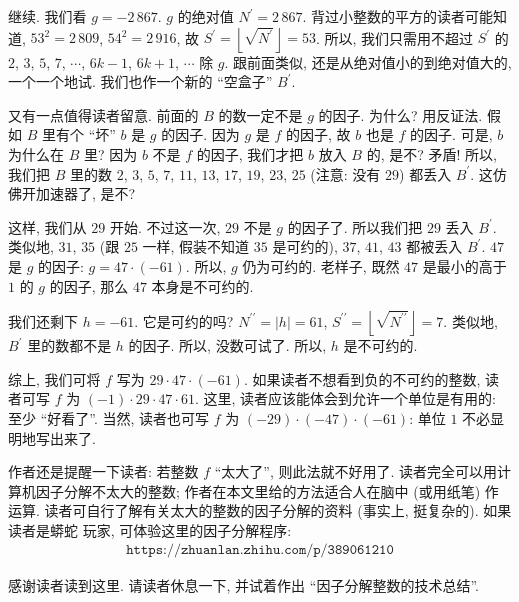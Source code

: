 \begin{example}
    继续. 我们看 $g = -2\,867$. $g$ 的绝对值 $N^{\prime} = 2\,867$. 背过小整数的平方的读者可能知道, $53^2 = 2\,809$, $54^2 = 2\,916$, 故 $S^{\prime} = \left \lfloor \sqrt{N^{\prime}} \right \rfloor = 53$. 所以, 我们只需用不超过 $S^{\prime}$ 的 $2$, $3$, $5$, $7$, $\cdots$, $6k-1$, $6k+1$, $\cdots$ 除 $g$. 跟前面类似, 还是从绝对值小的到绝对值大的, 一个一个地试. 我们也作一个新的 ``空盒子'' $B^{\prime}$.

    又有一点值得读者留意. 前面的 $B$ 的数一定不是 $g$ 的因子. 为什么? 用反证法. 假如 $B$ 里有个 ``坏'' $b$ 是 $g$ 的因子. 因为 $g$ 是 $f$ 的因子, 故 $b$ 也是 $f$ 的因子. 可是, $b$ 为什么在 $B$ 里? 因为 $b$ 不是 $f$ 的因子, 我们才把 $b$ 放入 $B$ 的, 是不? 矛盾! 所以, 我们把 $B$ 里的数 $2$, $3$, $5$, $7$, $11$, $13$, $17$, $19$, $23$, $25$ (注意: 没有 $29$) 都丢入 $B^{\prime}$. 这仿佛开加速器了, 是不?

    这样, 我们从 $29$ 开始. 不过这一次, $29$ 不是 $g$ 的因子了. 所以我们把 $29$ 丢入 $B^{\prime}$. 类似地, $31$, $35$ (跟 $25$ 一样, 假装不知道 $35$ 是可约的), $37$, $41$, $43$ 都被丢入 $B^{\prime}$. $47$ 是 $g$ 的因子: $g = 47 \cdot (-61)$. 所以, $g$ 仍为可约的. 老样子, 既然 $47$ 是最小的高于 $1$ 的 $g$ 的因子, 那么 $47$ 本身是不可约的.

    我们还剩下 $h = -61$. 它是可约的吗? $N^{\prime \prime} = |h| = 61$, $S^{\prime \prime} = \left \lfloor \sqrt{N^{\prime \prime}} \right \rfloor = 7$. 类似地, $B^{\prime}$ 里的数都不是 $h$ 的因子. 所以, 没数可试了. 所以, $h$ 是不可约的.

    综上, 我们可将 $f$ 写为 $29 \cdot 47 \cdot (-61)$. 如果读者不想看到负的不可约的整数, 读者可写 $f$ 为 $(-1) \cdot 29 \cdot 47 \cdot 61$. 这里, 读者应该能体会到允许一个单位是有用的: 至少 ``好看了''. 当然, 读者也可写 $f$ 为 $(-29) \cdot (-47) \cdot (-61)$: 单位 $1$ 不必显明地写出来了.
\end{example}

\begin{remark}
    作者还是提醒一下读者: 若整数 $f$ ``太大了'', 则此法就不好用了. 读者完全可以用计算机因子分解不太大的整数; 作者在本文里给的方法适合人在脑中 (或用纸笔) 作运算. 读者可自行了解有关太大的整数的因子分解的资料 (事实上, 挺复杂的). 如果读者是蟒蛇  玩家, 可体验这里的因子分解程序:
    \begin{align*}
        \texttt{https://zhuanlan.zhihu.com/p/389061210}
    \end{align*}
\end{remark}

感谢读者读到这里. 请读者休息一下, 并试着作出 ``因子分解整数的技术总结''.

